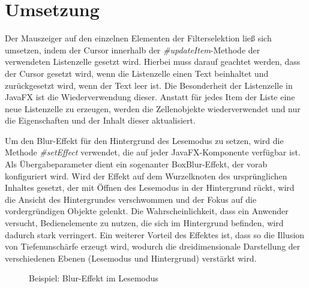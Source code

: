 \section{Umsetzung} \label{sec:optiImplementation}
Der Mauszeiger auf den einzelnen Elementen der Filterselektion ließ sich umsetzen, indem der Cursor innerhalb der \textit{\#{}updateItem}-Methode der verwendeten Listenzelle gesetzt wird. Hierbei muss darauf geachtet werden, dass der Cursor gesetzt wird, wenn die Listenzelle einen Text beinhaltet und zurückgesetzt wird, wenn der Text leer ist. Die Besonderheit der Listenzelle in JavaFX ist die Wiederverwendung dieser. Anstatt für jedes Item der Liste eine neue Listenzelle zu erzeugen, werden die Zellenobjekte wiederverwendet und nur die Eigenschaften und der Inhalt dieser aktualisiert.\par
{}
Um den Blur-Effekt für den Hintergrund des Lesemodus zu setzen, wird die Methode \textit{\#{}setEffect} verwendet, die auf jeder JavaFX-Komponente verfügbar ist. Als Übergabeparameter dient ein sogenanter BoxBlur-Effekt, der vorab konfiguriert wird. Wird der Effekt auf dem Wurzelknoten des ursprünglichen Inhaltes gesetzt, der mit Öffnen des Lesemodus in der Hintergrund rückt, wird die Ansicht des Hintergrundes verschwommen und der Fokus auf die vordergründigen Objekte gelenkt. Die Wahrscheinlichkeit, dass ein Anwender versucht, Bedienelemente zu nutzen, die sich im Hintergrund befinden, wird dadurch stark verringert. Ein weiterer Vorteil des Effektes ist, dass so die Illusion von Tiefenunschärfe erzeugt wird, wodurch die dreidimensionale Darstellung der verschiedenen Ebenen (Lesemodus und Hintergrund) verstärkt wird.\par
\begin{figure}[H] 
	\centering
	\hspace{1.0em}
	\caption{Beispiel: Blur-Effekt im Lesemodus}
	\label{fig:blurGallery}
\end{figure}
